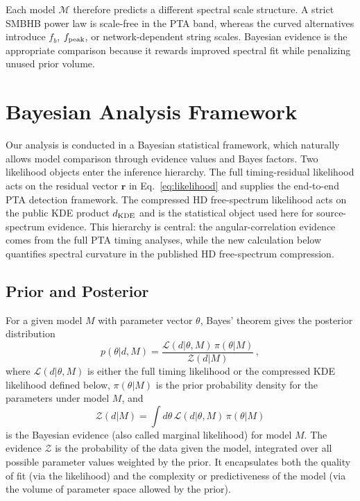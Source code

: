 \documentclass[symmetry,article,submit,pdftex,moreauthors]{Definitions/mdpi}
\begin{document}
Each model $\mathcal{M}$ therefore predicts a different spectral scale structure. A strict SMBHB power law is scale-free in the PTA band, whereas the curved alternatives introduce $f_b$, $f_{\rm peak}$, or network-dependent string scales. Bayesian evidence is the appropriate comparison because it rewards improved spectral fit while penalizing unused prior volume.

\section{Bayesian Analysis Framework}\label{sec:bayesian}
Our analysis is conducted in a Bayesian statistical framework, which naturally allows model comparison through evidence values and Bayes factors. Two likelihood objects enter the inference hierarchy. The full timing-residual likelihood acts on the residual vector $\mathbf{r}$ in Eq.~\eqref{eq:likelihood} and supplies the end-to-end PTA detection framework. The compressed HD free-spectrum likelihood acts on the public KDE product $d_{\rm KDE}$ and is the statistical object used here for source-spectrum evidence. This hierarchy is central: the angular-correlation evidence comes from the full PTA timing analyses, while the new calculation below quantifies spectral curvature in the published HD free-spectrum compression.

\subsection{Prior and Posterior}
For a given model $M$ with parameter vector $\theta$, Bayes' theorem gives the posterior distribution
\begin{equation}\label{eq:posterior}
    p(\theta | d, M) = \frac{\mathcal{L}(d|\theta, M)\, \pi(\theta|M)}{\mathcal{Z}(d|M)}\,,
\end{equation}
where $\mathcal{L}(d|\theta, M)$ is either the full timing likelihood or the compressed KDE likelihood defined below, $\pi(\theta|M)$ is the prior probability density for the parameters under model $M$, and 
\begin{equation}\label{eq:evidence}
    \mathcal{Z}(d|M) = \int d\theta\, \mathcal{L}(d|\theta, M)\, \pi(\theta|M)
\end{equation}
is the Bayesian evidence (also called marginal likelihood) for model $M$. The evidence $\mathcal{Z}$ is the probability of the data given the model, integrated over all possible parameter values weighted by the prior. It encapsulates both the quality of fit (via the likelihood) and the complexity or predictiveness of the model (via the volume of parameter space allowed by the prior).
\end{document}

